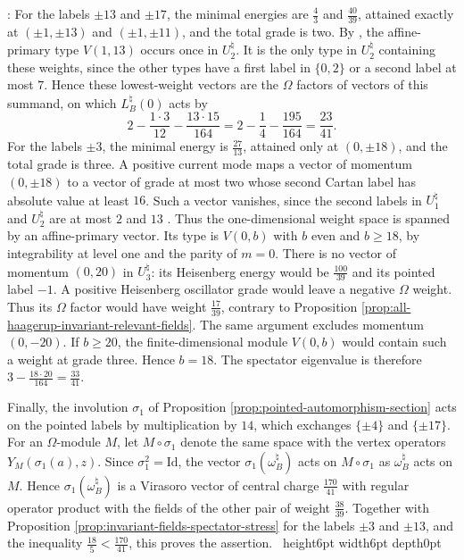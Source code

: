 \documentclass[leqno]{article}
\newcommand{\Id}{\mathrm{Id}}
\renewcommand{\geq}{\ensuremath{\geqslant}}
\newcommand{\qed}{\hfill \vrule height6pt  width6pt depth0pt}
\newenvironment{proof}[1][]{\noindent {\it Proof #1} : }{\hbox{~}\qed
\smallskip
}
\numberwithin{equation}{section}
\begin{document}
\begin{proof}
For the labels $\pm13$ and $\pm17$, the minimal energies are $\frac43$ and $\frac{40}{39}$, attained exactly at $(\pm1,\pm13)$ and $(\pm1,\pm11)$, and the total grade is two. By \cite[Table 2 p.~24]{Arh26a}, the affine-primary type $V(1,13)$ occurs once in $U_2^\natural$. It is the only type in $U_2^\natural$ containing these weights, since the other types have a first label in $\{0,2\}$ or a second label at most $7$. Hence these lowest-weight vectors are the $\Omega$ factors of vectors of this summand, on which $L_B^\natural(0)$ acts by
\[
2-\frac{1 \cdot 3}{12}-\frac{13 \cdot 15}{164} = 2-\frac14-\frac{195}{164} = \frac{23}{41}.
\]
For the labels $\pm3$, the minimal energy is $\frac{27}{13}$, attained only at $(0,\pm18)$, and the total grade is three. A positive current mode maps a vector of momentum $(0,\pm18)$ to a vector of grade at most two whose second Cartan label has absolute value at least $16$. Such a vector vanishes, since the second labels in $U_1^\natural$ and $U_2^\natural$ are at most $2$ and $13$ \cite[Table 2 p.~24]{Arh26a}. Thus the one-dimensional weight space is spanned by an affine-primary vector. Its type is $V(0,b)$ with $b$ even and $b \geq 18$, by integrability at level one and the parity of $m = 0$. There is no vector of momentum $(0,20)$ in $U_3^\natural$: its Heisenberg energy would be $\frac{100}{39}$ and its pointed label $-1$. A positive Heisenberg oscillator grade would leave a negative $\Omega$ weight. Thus its $\Omega$ factor would have weight $\frac{17}{39}$, contrary to Proposition \ref{prop:all-haagerup-invariant-relevant-fields}. The same argument excludes momentum $(0,-20)$. If $b \geq 20$, the finite-dimensional module $V(0,b)$ would contain such a weight at grade three. Hence $b = 18$. The spectator eigenvalue is therefore $3-\frac{18\cdot20}{164} = \frac{33}{41}$.

Finally, the involution $\sigma_1$ of Proposition \ref{prop:pointed-automorphism-section} acts on the pointed labels by multiplication by $14$, which exchanges $\{\pm4\}$ and $\{\pm17\}$. For an $\Omega$-module $M$, let $M \circ \sigma_1$ denote the same space with the vertex operators $Y_M(\sigma_1(a),z)$. Since $\sigma_1^2 = \Id$, the vector $\sigma_1(\omega_B^\natural)$ acts on $M \circ \sigma_1$ as $\omega_B^\natural$ acts on $M$. Hence $\sigma_1(\omega_B^\natural)$ is a Virasoro vector of central charge $\frac{170}{41}$ with regular operator product with the fields of the other pair of weight $\frac{38}{39}$. Together with Proposition \ref{prop:invariant-fields-spectator-stress} for the labels $\pm3$ and $\pm13$, and the inequality $\frac{18}{5} < \frac{170}{41}$, this proves the assertion.
\end{proof}
\end{document}
